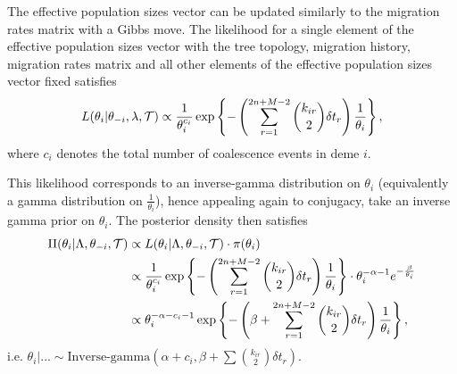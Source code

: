 The effective population sizes vector can be updated similarly to the migration rates matrix with a Gibbs move. The likelihood for a single element of the effective population sizes vector with the tree topology, migration history, migration rates matrix and all other elements of the effective population sizes vector fixed satisfies
	\[
		L(\theta_i | \theta_{-i}, \lambda, \mathcal{T}) \propto \frac{1}{\theta_i^{c_i}} \exp \left\{ - \left( \sum_{r=1}^{2n+M-2} \binom{k_{ir}}{2} \delta t_r \right) \frac{1}{\theta_i} \right\},
	\]
where $c_i$ denotes the total number of coalescence events in deme $i$.

This likelihood corresponds to an inverse-gamma distribution on $\theta_i$ (equivalently a gamma distribution on $\frac{1}{\theta_i}$), hence appealing again to conjugacy, take an inverse gamma prior on $\theta_i$. The posterior density then satisfies
	\begin{align*}
		\Pi(\theta_i | \Lambda, \theta_{-i}, \mathcal{T}) & \propto L(\theta_i | \Lambda, \theta_{-i}, \mathcal{T}) \cdot \pi(\theta_i) \\
		& \propto \frac{1}{\theta_i^{c_i}} \exp \left\{ - \left( \sum_{r=1}^{2n+M-2} \binom{k_{ir}}{2} \delta t_r \right) \frac{1}{\theta_i} \right\} \cdot \theta_i^{-\alpha - 1} e^{- \frac{\beta}{\theta_i}} \\
		& \propto \theta_i^{-\alpha - c_i - 1} \exp \left\{ - \left( \beta + \sum_{r=1}^{2n + M - 2} \binom{k_{ir}}{2} \delta t_r \right) \frac{1}{\theta_i} \right\},
	\end{align*}
i.e. $\theta_i | ... \sim \text{Inverse-gamma} (\alpha + c_i, \beta + \sum \binom{k_{ir}}{2} \delta t_r)$.

